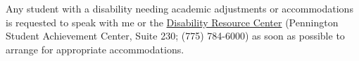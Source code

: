 Any student with a disability needing academic adjustments or accommodations is
requested to speak with me or the
\href{https://www.unr.edu/drc}{Disability Resource Center} (Pennington Student
Achievement Center, Suite 230; (775) 784-6000) as soon as possible to arrange for
appropriate accommodations.

